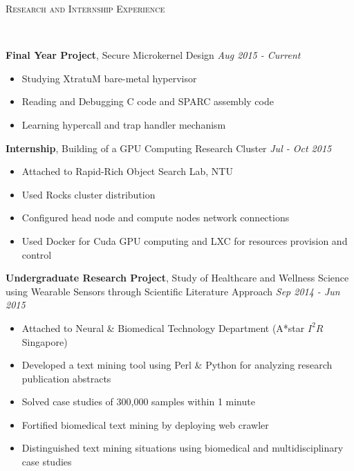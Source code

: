 \documentclass[a4paper, 12pt]{article}
\newenvironment{changemargin}[2]{%
  \begin{list}{}{%
      \setlength{\topsep}{0pt}%
      \setlength{\leftmargin}{#1}%
      \setlength{\rightmargin}{#2}%
      \setlength{\listparindent}{\parindent}%
      \setlength{\itemindent}{\parindent}%
      \setlength{\parsep}{\parskip}%
    }%
  \item[]}{\end{list}
}
\newcommand{\lineover}{
  \begin{changemargin}{-0.05in}{-0.05in}
    \vspace*{-8pt}
    \hrulefill \\
    \vspace*{-2pt}
  \end{changemargin}
}
\newcommand{\header}[1]{
  \begin{changemargin}{-0.6in}{-0.6in}
    \fontsize{15}{15}\scshape{#1}\\
    \lineover
    \vspace*{-4pt}
  \end{changemargin}
}
\newenvironment{body}
{
\vspace*{-16pt}
\begin{changemargin}{-0.25in}{-0.5in}
}
{
\end{changemargin}
}
\begin{document}
\smallskip
\header{Research and Internship Experience}
\begin{body}
  \vspace{14pt}
  \textbf{Final Year Project}, {Secure Microkernel Design} \hfill \emph{Aug 2015 - Current}\\
  \vspace*{-6pt}
  \begin{itemize} \itemsep -0pt  \small
  \item Studying XtratuM bare-metal hypervisor
  \item Reading and Debugging C code and SPARC assembly code
  \item Learning hypercall and trap handler mechanism
  \end{itemize}

  \textbf{Internship}, {Building of a GPU Computing Research Cluster} \hfill \emph{Jul - Oct 2015}\\
  \vspace*{-6pt}
  \begin{itemize} \itemsep -0pt  \small
  \item Attached to Rapid-Rich Object Search Lab, NTU
  \item Used Rocks cluster distribution
  \item Configured head node and compute nodes network connections
  \item Used Docker for Cuda GPU computing and LXC for resources provision and control
  \end{itemize}

  \textbf{Undergraduate Research Project}, {Study of Healthcare and Wellness Science using Wearable Sensors through Scientific Literature Approach} \hfill \emph{Sep 2014 - Jun 2015}\\
  \vspace*{-6pt}
  \begin{itemize} \itemsep -0pt  \small
  \item Attached to Neural \& Biomedical Technology Department (A*star $I^{2}R$ Singapore)
  \item Developed a text mining tool using Perl \& Python for analyzing research publication abstracts
  \item Solved case studies of 300,000 samples within 1 minute
  \item Fortified biomedical text mining by deploying web crawler
  \item Distinguished text mining situations using biomedical and multidisciplinary case studies
  \end{itemize}


\end{body}
\end{document}
